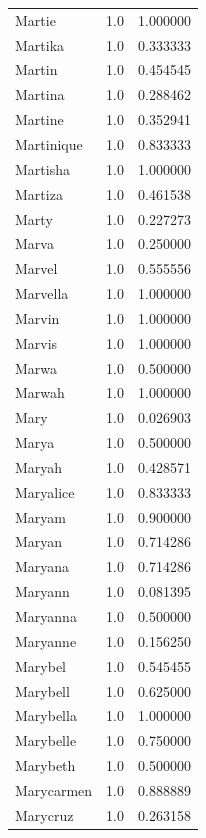 \documentclass[
  letterpaper,
  DIV=11,
  numbers=noendperiod]{scrreprt}
\begin{document}
\begin{tabular}{lrr}
Martie          &   1.0 &   1.000000 \\
Martika         &   1.0 &   0.333333 \\
Martin          &   1.0 &   0.454545 \\
Martina         &   1.0 &   0.288462 \\
Martine         &   1.0 &   0.352941 \\
Martinique      &   1.0 &   0.833333 \\
Martisha        &   1.0 &   1.000000 \\
Martiza         &   1.0 &   0.461538 \\
Marty           &   1.0 &   0.227273 \\
Marva           &   1.0 &   0.250000 \\
Marvel          &   1.0 &   0.555556 \\
Marvella        &   1.0 &   1.000000 \\
Marvin          &   1.0 &   1.000000 \\
Marvis          &   1.0 &   1.000000 \\
Marwa           &   1.0 &   0.500000 \\
Marwah          &   1.0 &   1.000000 \\
Mary            &   1.0 &   0.026903 \\
Marya           &   1.0 &   0.500000 \\
Maryah          &   1.0 &   0.428571 \\
Maryalice       &   1.0 &   0.833333 \\
Maryam          &   1.0 &   0.900000 \\
Maryan          &   1.0 &   0.714286 \\
Maryana         &   1.0 &   0.714286 \\
Maryann         &   1.0 &   0.081395 \\
Maryanna        &   1.0 &   0.500000 \\
Maryanne        &   1.0 &   0.156250 \\
Marybel         &   1.0 &   0.545455 \\
Marybell        &   1.0 &   0.625000 \\
Marybella       &   1.0 &   1.000000 \\
Marybelle       &   1.0 &   0.750000 \\
Marybeth        &   1.0 &   0.500000 \\
Marycarmen      &   1.0 &   0.888889 \\
Marycruz        &   1.0 &   0.263158 \\

\end{tabular}
\end{document}

